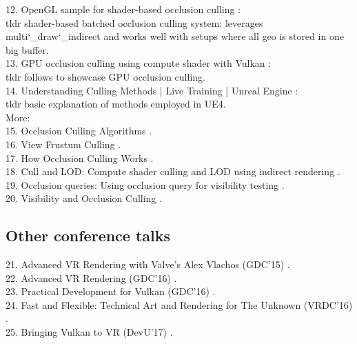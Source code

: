 12. OpenGL sample for shader-based occlusion culling \cite{Kubisch.2014}: \\
tldr shader-based batched occlusion culling system: leverages multi\char`_draw\char`_indirect and works well with setups where all geo is stored in one big buffer.\\

13. GPU occlusion culling using compute shader with Vulkan \cite{sydneyzh.2018}: \\
tldr follows \cite{Anagnostou.2017} to showcase GPU occlusion culling.\\

14. Understanding Culling Methods | Live Training | Unreal Engine \cite{Hobson.2019}: \\
tldr basic explanation of methods employed in UE4.\\

More:\\
15. Occlusion Culling Algorithms \cite{Haines.1999}. \\
16. View Frustum Culling \cite{Lighthouse3d.com.2011}.\\
17. How Occlusion Culling Works \cite{thebennybox.2018}.\\
18. Cull and LOD: Compute shader culling and LOD using indirect rendering \cite{Willems.2016.6}.\\
19. Occlusion queries: Using occlusion query for visibility testing \cite{Willems.2016.4}.\\
20. Visibility and Occlusion Culling \cite{EpicGamesInc..n.d.}.\\

\subsection{Other conference talks}
21. Advanced VR Rendering with Valve's Alex Vlachos (GDC'15) \cite{Vlachos.2016}.\\
22. Advanced VR Rendering (GDC'16) \cite{Vlachos.2016b}.\\
23. Practical Development for Vulkan (GDC'16) \cite{Ginsburg.2016}.\\
24. Fast and Flexible: Technical Art and Rendering for The Unknown (VRDC'16) \cite{Answer.2016}.\\
25. Bringing Vulkan to VR (DevU'17) \cite{Everitt.2017}.\\

